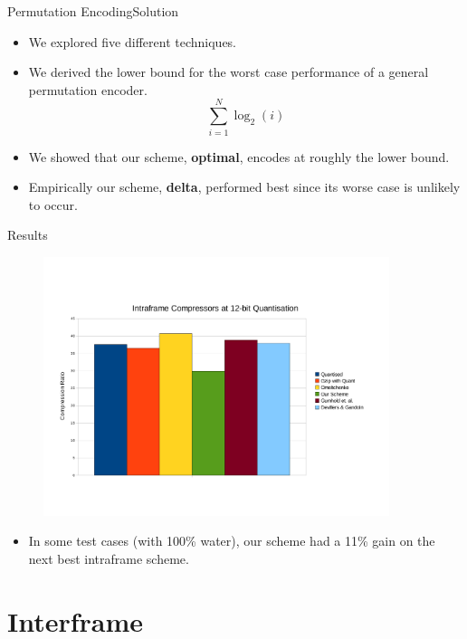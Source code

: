 \documentclass{beamer}
\begin{document}
\begin{frame}{Permutation Encoding}{Solution}
  \begin{itemize}
  \item We explored five different techniques.
  \item We derived the lower bound for the worst case performance of a general
    permutation encoder.
    \begin{equation*}
      \displaystyle\sum^{N}_{i=1} \log_2(i)
    \end{equation*}
  \item We showed that our scheme, \textbf{optimal}, encodes at roughly the
    lower bound.
  \item Empirically our scheme, \textbf{delta}, performed best since its worse
    case is unlikely to occur.
  \end{itemize}
\end{frame}

\begin{frame}{Results}
  \begin{figure}[h]
    \centering \includegraphics[trim = 10mm 30mm 10mm 35mm, clip,
      width=0.9\textwidth]{keegan-images/results-average}
  \end{figure}
  \begin{itemize}
  \item In some test cases (with 100\% water), our scheme had a 11\% gain on
    the next best intraframe scheme.
  \end{itemize}
\end{frame}


\section{Interframe}
\end{document}
